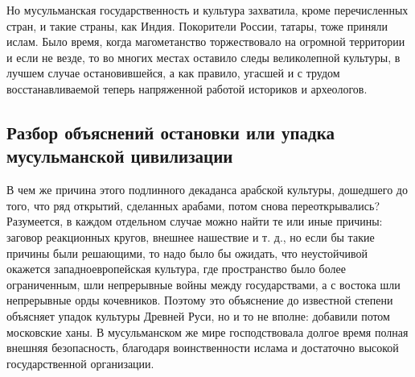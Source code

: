 Но  мусульманская   государственность  и  культура   захватила,  кроме
перечисленных  стран, и  такие страны,  как Индия.  Покорители России,
татары,   тоже  приняли   ислам.  Было   время,  когда   магометанство
торжествовало  на  огромной   территории  и  если  не   везде,  то  во
многих местах  оставило следы  великолепной культуры, в  лучшем случае
остановившейся, а  как правило,  угасшей и с  трудом восстанавливаемой
теперь напряженной работой историков и археологов.

\subsection{Разбор  объяснений  остановки   или  упадка  мусульманской
цивилизации}

В  чем  же  причина  этого  подлинного  декаданса  арабской  культуры,
дошедшего до  того, что ряд  открытий, сделанных арабами,  потом снова
переоткрывались? Разумеется, в каждом  отдельном случае можно найти те
или  иные причины:  заговор  реакционных кругов,  внешнее нашествие  и
т.  д.,  но  если  бы  такие причины  были  решающими,  то  надо  было
бы  ожидать, что  неустойчивой  окажется западноевропейская  культура,
где  пространство  было  более  ограниченным,  шли  непрерывные  войны
между  государствами, а  с  востока шли  непрерывные орды  кочевников.
Поэтому это объяснение до  известной степени объясняет упадок культуры
Древней Руси,  но и то  не вполне:  добавили потом московские  ханы. В
мусульманском  же  мире  господствовала долгое  время  полная  внешняя
безопасность,  благодаря воинственности  ислама  и достаточно  высокой
государственной организации.


